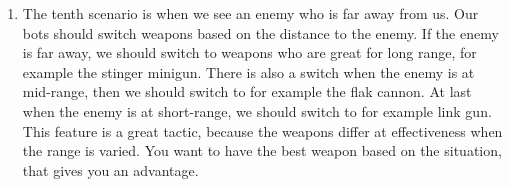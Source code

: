 \begin{enumerate}
	\item The tenth scenario is when we see an enemy who is far away from us. Our bots should switch weapons based on the distance to the enemy. If the enemy is far away, we should switch to weapons who are great for long range, for example the stinger minigun. There is also a switch when the enemy is at mid-range, then we should switch to for example the flak cannon. At last when the enemy is at short-range, we should switch to for example link gun. This feature is a great tactic, because the weapons differ at effectiveness when the range is varied. You want to have the best weapon based on the situation, that gives you an advantage. 
\end{enumerate}